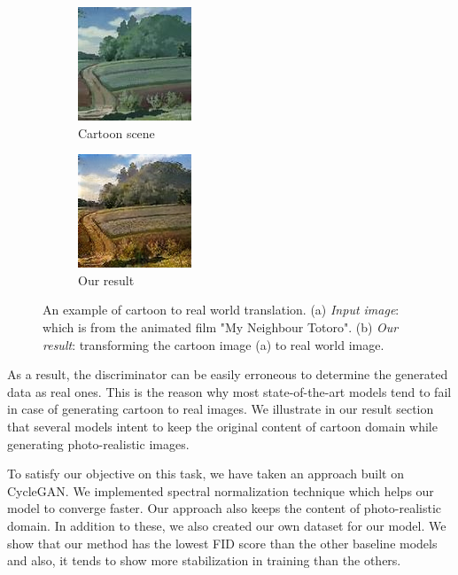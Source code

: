 \documentclass[conference]{IEEEtran}
\begin{document}
\begin{figure}[!htb]
    \centering
    \begin{subfigure}[b]{0.2\textwidth}
        \includegraphics[scale=0.75]{Intro_pic/268.jpg}
        \caption{Cartoon scene}
        \label{subfig: intro1}
    \end{subfigure}
    \begin{subfigure}[b]{0.2\textwidth}
        \includegraphics[scale=0.75]{Intro_pic/268_fake_B.png}
        \caption{Our result}
        \label{subfig:intro2}
    \end{subfigure}
    \caption{An example of cartoon to real world translation. (a) \textit{Input image}: which is from the animated film "My Neighbour Totoro". (b) \textit{Our result}: transforming the cartoon image (a) to real world image.}
    \label{fig:intro}
\end{figure}

As a result, the discriminator can be easily erroneous to determine the generated data as real ones.
This is the reason why most state-of-the-art models tend to fail in case of generating cartoon to real images. We illustrate in our result section that several models intent to keep the original content of cartoon domain while generating photo-realistic images.

To satisfy our objective on this task, we have taken an approach built on CycleGAN\cite{DBLP:conf/iccv/ZhuPIE17}. We implemented spectral normalization technique\cite{DBLP:journals/corr/abs-1802-05957} which helps our model to converge faster. Our approach also keeps the content of photo-realistic domain. In addition to these, we also created our own dataset for our model.
We show that our method has the {lowest FID score than the other baseline models and also, it tends to show more stabilization in training than the others}.
\end{document}

